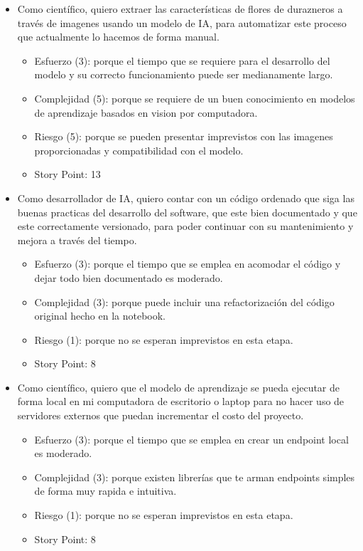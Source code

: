 \documentclass[
11pt, %
codirector, %
]{charter}
\begin{document}
\begin{itemize}
	\item Como científico, quiero extraer las características de flores de durazneros a través de imagenes usando un modelo de IA, para automatizar este proceso que actualmente lo hacemos de forma manual.
	\begin{itemize}
	\item Esfuerzo (3): porque el tiempo que se requiere para el desarrollo del modelo y su correcto funcionamiento puede ser medianamente largo.
	\item Complejidad (5): porque se requiere de un buen conocimiento en modelos de aprendizaje basados en vision por computadora. 
	\item Riesgo (5): porque se pueden presentar imprevistos con las imagenes proporcionadas y compatibilidad con el modelo.
	\item Story Point: 13
\end{itemize}
	\item Como desarrollador de IA, quiero contar con un código ordenado que siga las buenas practicas del desarrollo del software, que este bien documentado y que este correctamente versionado, para poder continuar con su mantenimiento y mejora a través del tiempo.
	\begin{itemize}
	\item Esfuerzo (3): porque el tiempo que se emplea en acomodar el código y dejar todo bien documentado es moderado.
	\item Complejidad (3): porque puede incluir una refactorización del código original hecho en la notebook.
	\item Riesgo (1): porque no se esperan imprevistos en esta etapa.
	\item Story Point: 8
\end{itemize}
	\item Como científico, quiero que el modelo de aprendizaje se pueda ejecutar de forma local en mi computadora de escritorio o laptop para no hacer uso de servidores externos que puedan incrementar el costo del proyecto.
	\begin{itemize}
	\item Esfuerzo (3): porque el tiempo que se emplea en crear un endpoint local es moderado.
	\item Complejidad (3): porque existen librerías que te arman endpoints simples de forma muy rapida e intuitiva.
	\item Riesgo (1): porque no se esperan imprevistos en esta etapa.
	\item Story Point: 8
\end{itemize}
\end{itemize}
\end{document}
